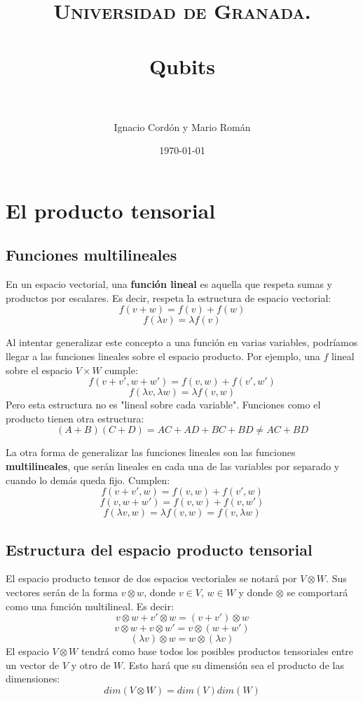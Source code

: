 \documentclass[paper=a4, fontsize=11pt, spanish]{scrartcl}
\title{
  \normalfont \normalsize 
  \textsc{Universidad de Granada.} \\ [25pt] %
  \horrule{0.5pt} \\[0.4cm] %
  \huge Qubits \\ %
  \horrule{2pt} \\[0.5cm] %
}
\author{Ignacio Cordón y Mario Román} %
\date{\normalsize\today} %
\numberwithin{equation}{section} %
\numberwithin{figure}{section} %
\numberwithin{table}{section} %
\begin{document}
\maketitle %

\section {El producto tensorial}
  \subsection {Funciones multilineales}
    En un espacio vectorial, una \textbf{función lineal} es aquella que respeta sumas y productos por escalares.
    Es decir, respeta la estructura de espacio vectorial:
    $$ f(v+w) = f(v) + f(w) $$
    $$ f(\lambda v) = \lambda f(v) $$

    Al intentar generalizar este concepto a una función en varias variables, podríamos llegar a las funciones 
    lineales sobre el espacio producto. Por ejemplo, una $f$ lineal sobre el espacio $V \times W$ cumple:
    $$ f(v+v',w+w') = f(v,w) + f(v',w')$$
    $$ f(\lambda v, \lambda w) = \lambda f(v,w) $$
    Pero esta estructura no es "lineal sobre cada variable". Funciones como el producto tienen otra
    estructura:
    $$ (A+B)(C+D) = AC+AD+BC+BD \neq AC+BD $$
    
    La otra forma de generalizar las funciones lineales son las funciones \textbf{multilineales}, que serán lineales
    en cada una de las variables por separado y cuando lo demás queda fijo. Cumplen:
    $$ f(v+v',w) = f(v,w) + f(v',w) $$
    $$ f(v,w+w') = f(v,w) + f(v,w') $$
    $$ f(\lambda v,w) = \lambda f(v,w) = f(v,\lambda w) $$

  \subsection{Estructura del espacio producto tensorial}
    El espacio producto tensor de dos espacios vectoriales se notará por $V \otimes W$. Sus vectores serán de
    la forma $v \otimes w$, donde $v \in V$, $w \in W$ y donde $\otimes$ se comportará como una función multilineal.
    Es decir:
    $$ v \otimes w + v' \otimes w  = (v+v') \otimes w $$
    $$ v \otimes w + v \otimes w'  = v \otimes (w+w') $$
    $$ (\lambda v) \otimes w = w \otimes (\lambda v)  $$
    El espacio $V \otimes W$ tendrá como base todos los posibles productos tensoriales entre un vector de $V$ y otro
    de $W$. Esto hará que su dimensión sea el producto de las dimensiones:
    $$ dim(V \otimes W) = dim(V)dim(W) $$
    
\end{document}
